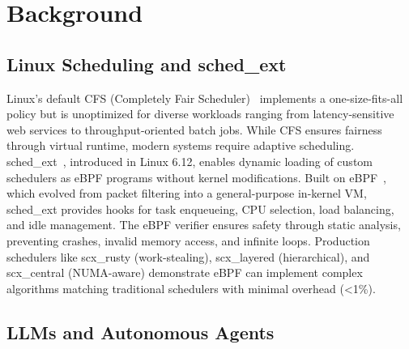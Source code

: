 \section{Background}
\label{sec:background}

\subsection{Linux Scheduling and sched\_ext}

Linux's default CFS (Completely Fair Scheduler)~\cite{wong2008cfs} implements a one-size-fits-all policy but is unoptimized for diverse workloads ranging from latency-sensitive web services to throughput-oriented batch jobs. While CFS ensures fairness through virtual runtime, modern systems require adaptive scheduling. sched\_ext~\cite{schedext2024}, introduced in Linux 6.12, enables dynamic loading of custom schedulers as eBPF programs without kernel modifications. Built on eBPF~\cite{mccanne1993bpf,gregg2019bpf}, which evolved from packet filtering into a general-purpose in-kernel VM, sched\_ext provides hooks for task enqueueing, CPU selection, load balancing, and idle management. The eBPF verifier ensures safety through static analysis, preventing crashes, invalid memory access, and infinite loops. Production schedulers like scx\_rusty (work-stealing), scx\_layered (hierarchical), and scx\_central (NUMA-aware) demonstrate eBPF can implement complex algorithms matching traditional schedulers with minimal overhead (<1\%).

\subsection{LLMs and Autonomous Agents}

